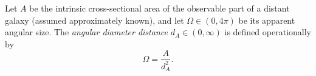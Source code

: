 Let $A$ be the intrinsic cross-sectional area of the observable part of a distant galaxy (assumed approximately known), and let $\Omega \in (0, 4\pi)$ be its apparent angular size. The \emph{angular diameter distance} $d_A \in (0, \infty)$ is defined operationally by
$$\Omega = \frac{A}{d_A^2}.$$
